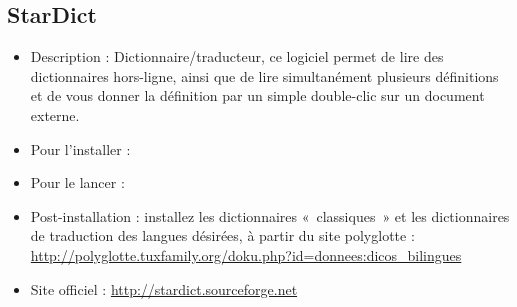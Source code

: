 \subsection{StarDict}
\begin{itemize}
\begingroup
{}
\item Description : Dictionnaire/traducteur, ce logiciel permet de lire des dictionnaires hors-ligne, ainsi que de lire simultanément plusieurs définitions et de vous donner la définition par un simple double-clic sur un document externe.{\par}
\item Pour l'installer : 
\item Pour le lancer : 
\item Post-installation : installez les dictionnaires «~classiques~» et les dictionnaires de traduction des langues désirées, à partir du site polyglotte : \url{http://polyglotte.tuxfamily.org/doku.php?id=donnees:dicos_bilingues}{\par}
\item Site officiel : \url{http://stardict.sourceforge.net}{\par}
\endgroup
\end{itemize}



